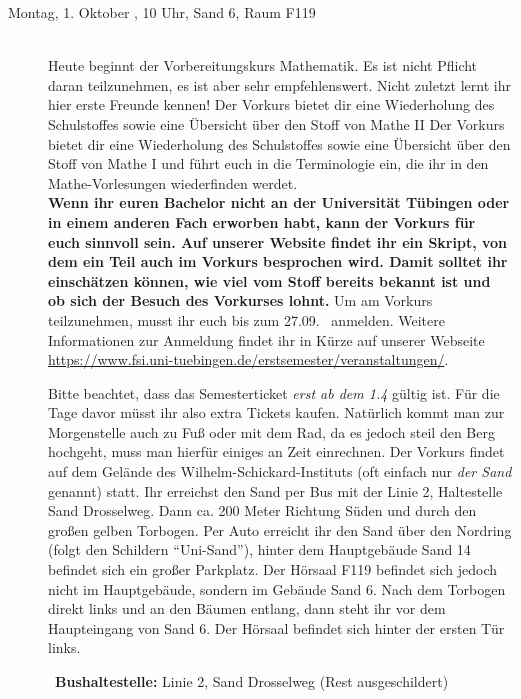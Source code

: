 \begin{description}


\item[Montag, 1. Oktober \Jahr, 10 Uhr, Sand 6, Raum F119]\ \\
Heute beginnt der Vorbereitungskurs Mathematik. Es ist nicht Pflicht daran teilzunehmen,
es ist aber sehr empfehlenswert. Nicht zuletzt lernt ihr hier erste Freunde kennen!
\ifsommersemester
Der Vorkurs bietet dir eine Wiederholung des Schulstoffes sowie eine Übersicht über den Stoff von Mathe II
\fi
\ifwintersemester
Der Vorkurs bietet dir eine Wiederholung des Schulstoffes sowie eine Übersicht über den Stoff von Mathe I
\fi
und führt euch in die Terminologie ein, die ihr in den Mathe-Vorlesungen wiederfinden werdet.
\ifmaster
\\
\textbf{Wenn ihr euren Bachelor nicht an der Universität Tübingen oder in einem anderen Fach erworben habt, kann der Vorkurs für euch sinnvoll sein. Auf unserer Website findet ihr ein Skript, von dem ein Teil auch im Vorkurs besprochen wird. Damit solltet ihr einschätzen können, wie viel vom Stoff bereits bekannt ist und ob sich der Besuch des Vorkurses lohnt.}
\fi
Um am Vorkurs teilzunehmen, musst ihr euch bis zum 27.09. \Jahr~anmelden. Weitere Informationen zur Anmeldung findet ihr in Kürze auf unserer Webseite \url{https://www.fsi.uni-tuebingen.de/erstsemester/veranstaltungen/}.

\ifsommersemester
Bitte beachtet, dass das Semesterticket \emph{erst ab dem 1.4} gültig ist. Für die Tage davor müsst ihr also extra Tickets kaufen. Natürlich kommt man zur Morgenstelle auch zu Fuß oder mit dem Rad, da es jedoch steil den Berg hochgeht, muss man hierfür einiges an Zeit einrechnen.
\fi
Der Vorkurs findet auf dem Gelände des Wilhelm-Schickard-Instituts (oft einfach nur \emph{der Sand} genannt) statt. Ihr erreichst den Sand per Bus mit der Linie 2, Haltestelle Sand Drosselweg. Dann ca. 200 Meter Richtung Süden und durch den großen gelben Torbogen. Per Auto erreicht ihr den Sand über den Nordring (folgt den Schildern "`Uni-Sand"'), hinter dem Hauptgebäude Sand 14 befindet sich ein großer Parkplatz. Der Hörsaal F119 befindet sich jedoch nicht im Hauptgebäude, sondern im Gebäude Sand 6. Nach dem Torbogen direkt links und an den Bäumen entlang, dann steht ihr vor dem Haupteingang von Sand 6. Der Hörsaal befindet sich hinter der ersten Tür links.

~\textbf{Bushaltestelle:} Linie 2, Sand Drosselweg (Rest ausgeschildert)


\end{description}
